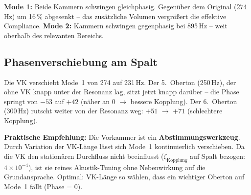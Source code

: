 \documentclass[11pt,a4paper]{article}
\begin{document}
\textbf{Mode 1:} Beide Kammern schwingen gleichphasig. Gegenüber dem Original (274\,Hz) um 16\,\% abgesenkt -- das zusätzliche Volumen vergrößert die effektive Compliance. \textbf{Mode 2:} Kammern schwingen gegenphasig bei 895\,Hz -- weit oberhalb des relevanten Bereichs.

\subsection{Phasenverschiebung am Spalt}

\begin{table}[H]
\centering\small
{}
\caption{Phase der Kammerimpedanz am Schlitz, mit und ohne Vorkammer ($Q_H \approx 7$)}
\end{table}

Die VK verschiebt Mode~1 von 274 auf 231\,Hz. Der 5.~Oberton (250\,Hz), der ohne VK knapp unter der Resonanz lag, sitzt jetzt knapp darüber -- die Phase springt von $-53$\textdegree{} auf $+42$\textdegree{} (näher an 0\textdegree{} $\to$ bessere Kopplung). Der 6.~Oberton (300\,Hz) rutscht weiter von der Resonanz weg: $+51$\textdegree{} $\to$ $+71$\textdegree{} (schlechtere Kopplung).

\begin{keybox}
\textbf{Praktische Empfehlung:} Die Vorkammer ist ein \textbf{Abstimmungswerkzeug}. Durch Variation der VK-Länge lässt sich Mode~1 kontinuierlich verschieben. Da die VK den stationären Durchfluss nicht beeinflusst ($\zeta_\text{Kopplung}$ auf Spalt bezogen: $4 \times 10^{-4}$), ist sie reines Akustik-Tuning ohne Nebenwirkung auf die Grundansprache. Optimal: VK-Länge so wählen, dass ein wichtiger Oberton auf Mode~1 fällt (Phase = 0\textdegree{}).
\end{keybox}

\end{document}
